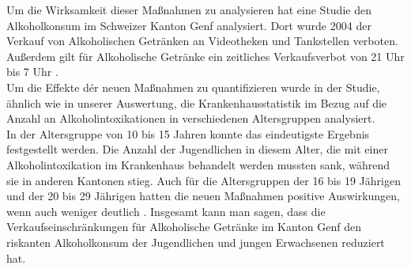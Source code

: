\documentclass[12pt]{article}
\begin{document}
Um die Wirksamkeit dieser Maßnahmen zu analysieren hat eine Studie den Alkoholkonsum im Schweizer Kanton Genf analysiert. Dort wurde 2004 der Verkauf von Alkoholischen Getränken an Videotheken und Tankstellen verboten. Außerdem gilt für Alkoholische Getränke ein zeitliches Verkaufsverbot von 21 Uhr bis 7 Uhr \autocite[27]{hagen_verkaufseinschrankungen_2011}. \\%
Um die Effekte dér neuen Maßnahmen zu quantifizieren wurde in der Studie, ähnlich wie in unserer Auswertung, die Krankenhausstatistik im Bezug auf die Anzahl an Alkoholintoxikationen in verschiedenen Altersgruppen analysiert.\\
In der Altersgruppe von 10 bis 15 Jahren konnte das eindeutigste Ergebnis festgestellt werden. Die Anzahl der Jugendlichen in diesem Alter, die mit einer Alkoholintoxikation im Krankenhaus behandelt werden mussten sank, während sie in anderen Kantonen stieg. Auch für die Altersgruppen der 16 bis 19 Jährigen und der 20 bis 29 Jährigen hatten die neuen Maßnahmen positive Auswirkungen, wenn auch weniger deutlich \autocite[28]{hagen_verkaufseinschrankungen_2011}. Insgesamt kann man sagen, dass die Verkaufseinschränkungen für Alkoholische Getränke im Kanton Genf den riskanten Alkoholkonsum der Jugendlichen und jungen Erwachsenen reduziert hat. 
\end{document}

